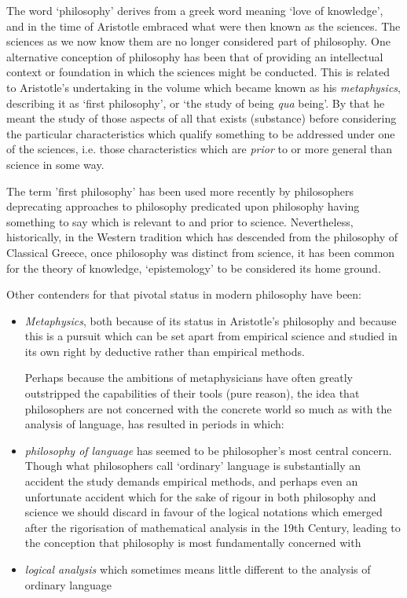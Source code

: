 The word `philosophy' derives from a greek word meaning `love of knowledge', and in the time of Aristotle embraced what were then known as the sciences.
The sciences as we now know them are no longer considered part of philosophy.
One alternative conception of philosophy has been that of providing an intellectual context or foundation in which the sciences might be conducted.
This is related to Aristotle's undertaking in the volume which became known as his \emph{metaphysics}, describing it as `first philosophy', or `the study of being \emph{qua} being'.
By that he meant the study of those aspects of all that exists (substance) before considering the particular characteristics which qualify something to be addressed under one of the sciences, i.e. those characteristics which are \emph{prior} to or more general than science in some way.

The term 'first philosophy' has been used more recently by philosophers deprecating approaches to philosophy predicated upon philosophy having something to say which is relevant to and prior to science.
Nevertheless, historically, in the Western tradition which has descended from the philosophy of Classical Greece, once philosophy was distinct from science, it has been common for the theory of knowledge, `epistemology' to be considered its home ground.

Other contenders for that pivotal status in modern philosophy have been:
\begin{itemize}
\item \emph{Metaphysics}, both because of its status in Aristotle's philosophy and because this is a pursuit which can be set apart from empirical science and studied in its own right by deductive rather than empirical methods.
  
  Perhaps because the ambitions of metaphysicians have often greatly outstripped the capabilities of their tools (pure reason), the idea that philosophers are not concerned with the concrete world so much as with the analysis of language, has resulted in periods in which:
  \item \emph{philosophy of language} has seemed to be philosopher's most central concern.
    Though what philosophers call `ordinary' language is substantially an accident the study demands empirical methods, and perhaps even an unfortunate accident which for the sake of rigour in both philosophy and science we should discard in favour of the logical notations which emerged after the rigorisation of mathematical analysis in the 19th Century, leading to the conception that philosophy is most fundamentally concerned with
  \item \emph{logical analysis}
    which sometimes means little different to the analysis of ordinary language
\end{itemize}


